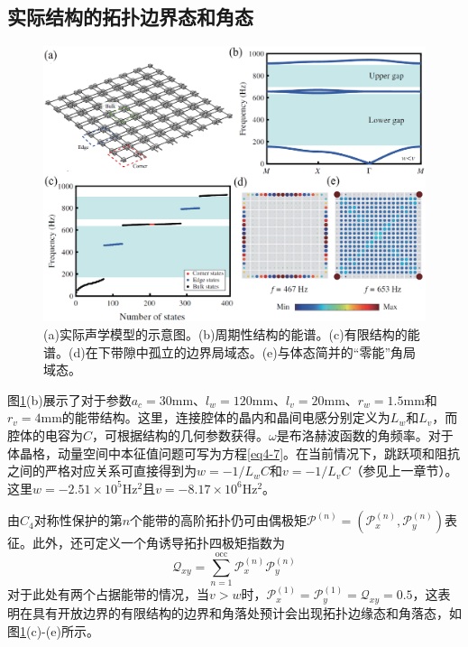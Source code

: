 \subsection{实际结构的拓扑边界态和角态}

\begin{figure}[h!]
    \centering
    \includegraphics[width=1\textwidth]{images/fig4-2.eps} 
    \caption{(a)实际声学模型的示意图。(b)周期性结构的能谱。(c)有限结构的能谱。(d)在下带隙中孤立的边界局域态。(e)与体态简并的“零能”角局域态。}
    \label{fig_4_2}
  \end{figure}  

图\ref{fig_4_2}(b)展示了对于参数$a_c = 30$mm、$l_w = 120$mm、$l_v = 20$mm、$r_w = 1.5$mm和$r_v = 4$mm的能带结构。这里，连接腔体的晶内和晶间电感分别定义为$L_w$和$L_v$，而腔体的电容为$C$，可根据结构的几何参数获得。$\omega$是布洛赫波函数的角频率。对于体晶格，动量空间中本征值问题可写为方程\ref{eq4-7}。在当前情况下，跳跃项和阻抗之间的严格对应关系可直接得到为$w = -1/L_wC$和$v = -1/L_vC$（参见上一章节）。这里$w = -2.51\times 10^5$Hz$^2$且$v = -8.17\times 10^6$Hz$^2$。

由$C_4$对称性保护的第$n$个能带的高阶拓扑仍可由偶极矩$\mathcal{P}^{(n)} = (\mathcal{P}_x^{(n)}, \mathcal{P}_y^{(n)})$表征。此外，还可定义一个角诱导拓扑四极矩指数为\cite{C45-3}
\begin{equation}
    \mathcal{Q}_{xy} = \sum_{n = 1}^{\text{occ}} \mathcal{P}_x^{(n)} \mathcal{P}_y^{(n)}
    \label{eq4-14}
\end{equation}
对于此处有两个占据能带的情况，当$v > w$时，$\mathcal{P}_x^{(1)} = \mathcal{P}_y^{(1)} = \mathcal{Q}_{xy} = 0.5$，这表明在具有开放边界的有限结构的边界和角落处预计会出现拓扑边缘态和角落态，如图\ref{fig_4_2}(c)-(e)所示。

